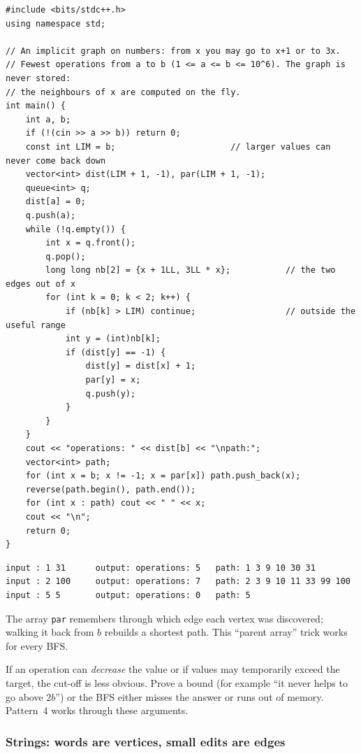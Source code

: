 \begin{lstlisting}[style=cpp]
#include <bits/stdc++.h>
using namespace std;

// An implicit graph on numbers: from x you may go to x+1 or to 3x.
// Fewest operations from a to b (1 <= a <= b <= 10^6). The graph is never stored:
// the neighbours of x are computed on the fly.
int main() {
    int a, b;
    if (!(cin >> a >> b)) return 0;
    const int LIM = b;                       // larger values can never come back down
    vector<int> dist(LIM + 1, -1), par(LIM + 1, -1);
    queue<int> q;
    dist[a] = 0;
    q.push(a);
    while (!q.empty()) {
        int x = q.front();
        q.pop();
        long long nb[2] = {x + 1LL, 3LL * x};           // the two edges out of x
        for (int k = 0; k < 2; k++) {
            if (nb[k] > LIM) continue;                  // outside the useful range
            int y = (int)nb[k];
            if (dist[y] == -1) {
                dist[y] = dist[x] + 1;
                par[y] = x;
                q.push(y);
            }
        }
    }
    cout << "operations: " << dist[b] << "\npath:";
    vector<int> path;
    for (int x = b; x != -1; x = par[x]) path.push_back(x);
    reverse(path.begin(), path.end());
    for (int x : path) cout << " " << x;
    cout << "\n";
    return 0;
}
\end{lstlisting}

\begin{lstlisting}[style=trace]
input : 1 31      output: operations: 5   path: 1 3 9 10 30 31
input : 2 100     output: operations: 7   path: 2 3 9 10 11 33 99 100
input : 5 5       output: operations: 0   path: 5
\end{lstlisting}

The array \texttt{par} remembers through which edge each vertex was discovered; walking it back from $b$ rebuilds a shortest path. This ``parent array'' trick works for every BFS.

\begin{warningbox}
If an operation can \emph{decrease} the value or if values may temporarily exceed the target, the cut-off is less obvious. Prove a bound (for example ``it never helps to go above $2b$'') or the BFS either misses the answer or runs out of memory. Pattern~4 works through these arguments.
\end{warningbox}

\subsubsection*{Strings: words are vertices, small edits are edges}


